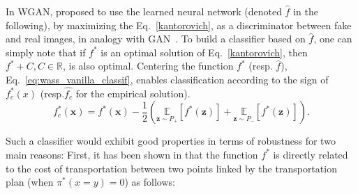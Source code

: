 \documentclass{article}
\begin{document}
In WGAN, \cite{Arjovsky2017} proposed to use the learned neural network (denoted $\hat{f}$ in the following),  by maximizing the Eq.~\eqref{kantorovich}, as a discriminator between fake and real images, in analogy with GAN~\cite{Goodfellow2014}.
To build a classifier based on $\hat{f}$, one can simply note that if  $f^*$ is an optimal solution of Eq.~\eqref{kantorovich}, then  $f^* + C, C\in \mathbb{R}$, is also optimal. Centering the function $f^*$ (resp. $\hat{f}$), Eq.~\eqref{eq:wass_vanilla_classif}, enables classification according to the sign of $f_c^*(x)$ (resp.$\hat{f_c}$ for the empirical solution).
\begin{equation}
\label{eq:wass_vanilla_classif}
f_c^*(\textbf{x} )=f^*(\textbf{x} )-\frac{1}{2}\left(\underset{\textbf{z}  \sim P_+}{\mathbb{E}} \left[f^*(\textbf{z} )\right] +\underset{\textbf{z}  \sim P_-}{\mathbb{E}} \left[f^*(\textbf{z} )\right]\right).
\end{equation}

Such a classifier would exhibit  good properties in terms of robustness for two main reasons: First, it has been shown in \cite{villani2008} that the function $f^*$ is directly related to the cost of transportation between two points linked by the transportation plan (when $\pi^*(x=y)=0$) as follows:

\end{document}
